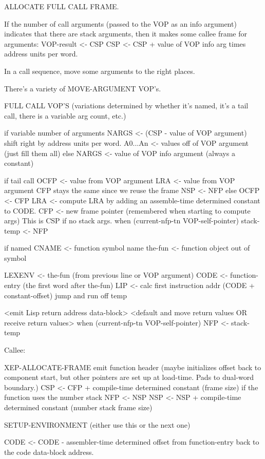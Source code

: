 ALLOCATE FULL CALL FRAME.

If the number of call arguments (passed to the VOP as an info argument)
indicates that there are stack arguments, then it makes some callee frame for
arguments:
   VOP-result <- CSP
   CSP <- CSP + value of VOP info arg times address units per word.

In a call sequence, move some arguments to the right places.

There's a variety of MOVE-ARGUMENT VOP's.

FULL CALL VOP'S
(variations determined by whether it's named, it's a tail call, there
is a variable arg count, etc.)

  if variable number of arguments
    NARGS <- (CSP - value of VOP argument) shift right by address units per word.
    A0...An <- values off of VOP argument (just fill them all)
  else
    NARGS <- value of VOP info argument (always a constant)

  if tail call
    OCFP <- value from VOP argument
    LRA <- value from VOP argument
    CFP stays the same since we reuse the frame
    NSP <- NFP
  else
    OCFP <- CFP
    LRA <- compute LRA by adding an assemble-time determined constant to
    	   CODE.
    CFP <- new frame pointer (remembered when starting to compute args)
           This is CSP if no stack args.
    when (current-nfp-tn VOP-self-pointer)
      stack-temp <- NFP

  if named
    CNAME <- function symbol name
    the-fun <- function object out of symbol

  LEXENV <- the-fun (from previous line or VOP argument)
  CODE <- function-entry (the first word after the-fun)
  LIP <- calc first instruction addr (CODE + constant-offset)
  jump and run off temp

  <emit Lisp return address data-block>
  <default and move return values OR receive return values>
  when (current-nfp-tn VOP-self-pointer)
    NFP <- stack-temp

Callee:

XEP-ALLOCATE-FRAME
  emit function header (maybe initializes offset back to component start,
  			but other pointers are set up at load-time.  Pads
			to dual-word boundary.)
  CSP <- CFP + compile-time determined constant (frame size)
  if the function uses the number stack
    NFP <- NSP
    NSP <- NSP + compile-time determined constant (number stack frame size)

SETUP-ENVIRONMENT
(either use this or the next one)

CODE <- CODE - assembler-time determined offset from function-entry back to
	       the code data-block address.

